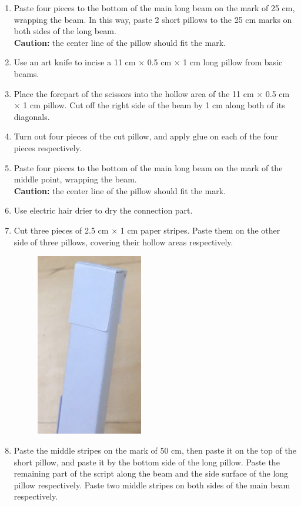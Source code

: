 \begin{enumerate}
\begin{enumerate}
\begin{figure}[H]
\begin{center}
	\end{center}
	\end{figure}
	\item Paste four pieces to the bottom of the main long beam on the mark of 25 cm, wrapping the beam. In this way, paste 2 short pillows to the 25 cm marks on both sides of the long beam. 
	\\ \textbf{Caution:} the center line of the pillow should fit the mark.
	\item Use an art knife to incise a 11 cm $\times$ 0.5 cm $\times$ 1 cm long pillow from basic beams. 
	\item Place the forepart of the scissors into the hollow area of the 11 cm $\times$ 0.5 cm $\times$ 1 cm pillow. Cut off the right side of the beam by 1 cm along both of its diagonals.
	\item Turn out four pieces of the cut pillow, and apply glue on each of the four pieces respectively. 
	\item Paste four pieces to the bottom of the main long beam on the mark of the middle point, wrapping the beam. 
	\\ \textbf{Caution:} the center line of the pillow should fit the mark.
	\item Use electric hair drier to dry the connection part. 
	\item Cut three pieces of 2.5 cm $\times$ 1 cm paper stripes. Paste them on the other side of three pillows, covering their hollow areas respectively.
	\begin{figure}[H]
	\begin{center}
	\includegraphics[height=8cm]{figure/procedureBridge/p2}
	\end{center}
	\end{figure}
	\item Paste the middle stripes on the mark of 50 cm, then paste it on the top of the short pillow, and paste it by the bottom side of the long pillow. Paste the remaining part of the script along the beam and the side surface of the long pillow respectively. Paste two middle stripes on both sides of the main beam respectively. 

\end{enumerate}
\end{enumerate}
